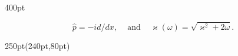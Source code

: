 \begin{frame}
\begin{textblock*}{400pt}
\begin{itemize}
\begin{equation}
  \hat{p} = -id/dx,\hspace{10pt} \mbox{ and } 
  \hspace{10pt} \varkappa(\omega) = \sqrt{\varkappa^2 + 2\omega}.
\end{equation}
\end{itemize}

\end{textblock*}

\begin{textblock*}{250pt}(240pt,80pt)
\end{textblock*}

\end{frame}





